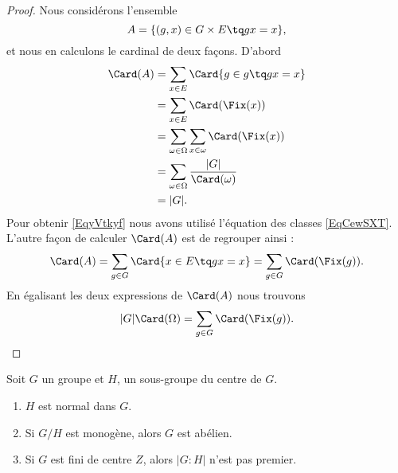 \begin{proof}
    Nous considérons l'ensemble
    \begin{equation}
        A=\{ (g,x)\in G\times E\tq gx=x \},
    \end{equation}
    et nous en calculons le cardinal de deux façons. D'abord
    \begin{subequations}
        \begin{align}
            \Card(A)&=\sum_{x\in E}\Card\{ g\in g\tq gx=x \}\\
            &=\sum_{x\in E}\Card(\Fix(x))\\
            &=\sum_{\omega\in \Omega}\sum_{x\in \omega}\Card(\Fix(x))\\
            &=\sum_{\omega\in \Omega}\frac{ | G | }{ \Card(\omega) }     \label{EqyVtkyf}\\
            &=| G |.
        \end{align}
    \end{subequations}
    Pour obtenir \eqref{EqyVtkyf} nous avons utilisé l'équation des classes \eqref{EqCewSXT}. L'autre façon de calculer \( \Card(A)\) est de regrouper ainsi :
    \begin{equation}
        \Card(A)=\sum_{g\in G}\Card\{ x\in E\tq gx=x \}=\sum_{g\in G}\Card(\Fix(g)).
    \end{equation}
    En égalisant les deux expressions de \( \Card(A)\) nous trouvons
    \begin{equation}
        | G |\Card(\Omega)=\sum_{g\in G}\Card(\Fix(g)).
    \end{equation}
\end{proof}

\begin{proposition}
    Soit \( G\) un groupe et \( H\), un sous-groupe du centre de \( G\).
    \begin{enumerate}
        \item
            \( H\) est normal dans \( G\).
        \item
            Si \( G/H\) est monogène, alors \( G\) est abélien.
        \item
            Si \( G\) est fini de centre \( Z\), alors \( | G:H |\) n'est pas premier.
    \end{enumerate}
\end{proposition}


